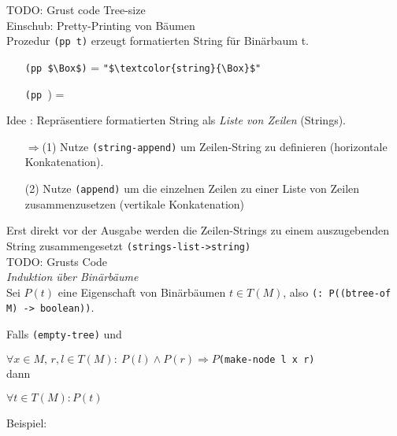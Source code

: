 TODO: Grust code Tree-size\\
Einschub: Pretty-Printing von Bäumen\\
Prozedur \lstinline|(pp t)| erzeugt formatierten String für Binärbaum t.
\begin{enumerate}
\item[] \lstinline[mathescape]|(pp $\Box$)| = \lstinline[mathescape]|"$\textcolor{string}{\Box}$"|
\item[] \lstinline|(pp |) = \begin{minipage}{0.5\textwidth}
\begin{tikzpicture}

\end{tikzpicture}
\end{minipage}
\end{enumerate}
Idee : Repräsentiere formatierten String als \emph{Liste von Zeilen} (Strings).
\begin{enumerate}[(1)]
\item[$\Rightarrow$(1)] Nutze \lstinline|(string-append)| um Zeilen-String zu definieren (horizontale Konkatenation).
\item[(2)] Nutze \lstinline|(append)| um die einzelnen Zeilen zu einer Liste von Zeilen zusammenzusetzen (vertikale Konkatenation)
\end{enumerate}
Erst direkt vor der Ausgabe werden die Zeilen-Strings zu einem auszugebenden String zusammengesetzt \lstinline|(strings-list->string)|\\
TODO: Grusts Code
\bigskip\\
\emph{Induktion über Binärbäume}\\
Sei $P(t)$ eine Eigenschaft von Binärbäumen $t \in T(M)$, also \lstinline|(: P((btree-of M) -> boolean))|.
\begin{mdframed}
Falls \lstinline|(empty-tree)| 
und
\par $\forall x \in M,\,r,l\in T(M):\:P(l) \land P(r) \Rightarrow P$\lstinline|(make-node l x r)|\\
 dann
\par $\forall t \in T(M) : P(t)$
\end{mdframed}
Beispiel:\\
